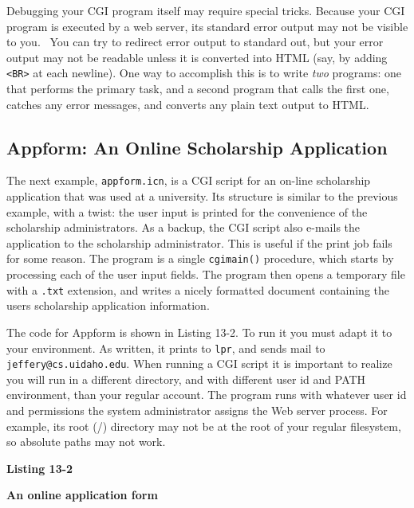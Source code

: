 {Debugging your CGI program itself may require special tricks. Because
your CGI program is executed by a web server, its standard error output
may not be visible to you. \ You can try to redirect error output to
standard out, but your error output may not be readable unless it is
converted into HTML (say, by adding
\texttt{{\textless}BR{\textgreater}} at each newline). One way to
accomplish this is to write \textit{two} programs: one that performs
the primary task, and a second program that calls the first one,
catches any error messages, and converts any plain text output to HTML.

\subsection{Appform: An Online Scholarship Application}

The next example, \texttt{appform.icn}, is a CGI script for an
on-line scholarship application that was used at a university. Its
structure is similar to the previous example, with a twist:
the user input is printed for the convenience of the scholarship
administrators. As a backup, the CGI script also e-mails the
application to the scholarship administrator. This is useful if the
print job fails for some reason.
The program is a single \texttt{cgimain()} procedure, which starts by
processing each of the user input fields. The program then opens a
temporary file with a \texttt{.txt} extension, and writes a nicely
formatted document containing the user{\textquotesingle}s scholarship
application information.

The code for Appform is shown in Listing 13-2. To run it you must
adapt it to your environment. As written, it prints to
\texttt{lpr}, and sends mail to \texttt{jeffery@cs.uidaho.edu}. When running a
CGI script it is important to realize you will run in a different
directory, and with different user id and PATH environment, than your
regular account. The program runs with whatever user id and
permissions the system administrator assigns the Web server
process. For example, its root (/) directory may not be at the root of
your regular filesystem, so absolute paths may not work.

{\sffamily\bfseries
Listing 13-2}

{\sffamily\bfseries
An online application form}

}
